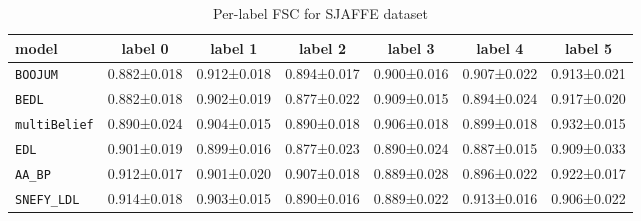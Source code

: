 \begin{table}[h]
\centering
\caption{Per-label FSC for SJAFFE dataset}
\label{tab:sjaffe_per_label_fsc}

\begin{tabular}{lcccccc}
\toprule
\textbf{model} & \textbf{label 0} & \textbf{label 1} & \textbf{label 2} & \textbf{label 3} & \textbf{label 4} & \textbf{label 5} \\
\midrule
\texttt{BOOJUM} & 0.882±0.018 & 0.912±0.018 & 0.894±0.017 & 0.900±0.016 & 0.907±0.022 & 0.913±0.021 \\
\texttt{BEDL} & 0.882±0.018 & 0.902±0.019 & 0.877±0.022 & 0.909±0.015 & 0.894±0.024 & 0.917±0.020 \\
\texttt{multiBelief} & 0.890±0.024 & 0.904±0.015 & 0.890±0.018 & 0.906±0.018 & 0.899±0.018 & 0.932±0.015 \\
\texttt{EDL} & 0.901±0.019 & 0.899±0.016 & 0.877±0.023 & 0.890±0.024 & 0.887±0.015 & 0.909±0.033 \\
\texttt{AA\_BP} & 0.912±0.017 & 0.901±0.020 & 0.907±0.018 & 0.889±0.028 & 0.896±0.022 & 0.922±0.017 \\
\texttt{SNEFY\_LDL} & 0.914±0.018 & 0.903±0.015 & 0.890±0.016 & 0.889±0.022 & 0.913±0.016 & 0.906±0.022 \\
\bottomrule
\end{tabular}

\end{table}